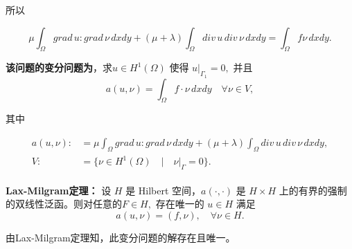 \documentclass[a4paper,UTF8,titlepage,10pt]{ctexart}
\numberwithin{equation}{subsection}
\begin{document}
所以

\begin{equation}
\mu \int_{\Omega} grad \, u : grad \, \nu \, dxdy + (\mu +\lambda) \int_{\Omega} div \, u \, div \, \nu \, dxdy = \int_{\Omega} f \nu \, dxdy .
\end{equation}

\textbf{该问题的变分问题为}，求$u \in H^1(\Omega)$ 使得 $u |_{\Gamma_1} = 0,$ 并且
\begin{equation}
a(u,\nu) = \int_{\Omega} f \cdot \nu \, dxdy \quad \forall \nu \in V ,
\label{bffc}
\end{equation}
\par
其中

\begin{equation}
	\begin{aligned}
		a(u,\nu) :&= \mu \int_{\Omega} grad \, u : grad \, \nu \, dxdy + (\mu +\lambda) \int_{\Omega} div \, u \, div \, \nu \,  dxdy , \\  		
		V :&= \{ \nu \in H^1(\Omega) \quad | \quad \nu |_{\Gamma} = 0 \} .
	\end{aligned}
\end{equation}

\textbf{Lax-Milgram定理\textsuperscript{\cite{brenner2008mathematical}}：} 设 $H$ 是 Hilbert 空间，$a(\cdot,\cdot)$ 是 $H \times H$ 上的有界的强制的双线性泛函。则对任意的$F \in H,$ 存在唯一的 $u \in H$ 满足
\begin{equation}
	a(u,\nu) = (f,\nu), \quad \forall \nu \in H .
\end{equation}

由Lax-Milgram定理知，此变分问题的解存在且唯一。




%
%	
%	
\end{document}
